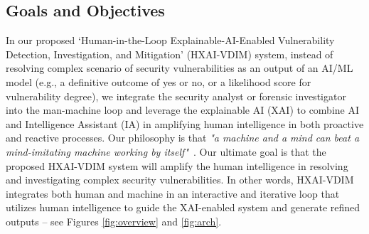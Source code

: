 \subsection{Goals and Objectives}

In our proposed `Human-in-the-Loop Explainable-AI-Enabled Vulnerability Detection, Investigation, and Mitigation' (HXAI-VDIM) system, instead of resolving complex scenario of security vulnerabilities as an output of an AI/ML model (e.g., a definitive outcome of yes or no, or a likelihood score for vulnerability degree), we integrate the security analyst or forensic investigator into the man-machine loop and leverage the explainable AI (XAI) to combine AI and Intelligence Assistant (IA) in amplifying human intelligence in both proactive and reactive processes. Our philosophy is that {\em "a machine and a mind can beat a mind-imitating machine working by itself"}~\cite{DBLP:conf/ifip/Brooks77}. Our ultimate goal is that the proposed HXAI-VDIM system will amplify the human intelligence in resolving and investigating complex security vulnerabilities. In other words, HXAI-VDIM integrates both human and machine in an interactive and iterative loop that utilizes human intelligence to guide the XAI-enabled system and generate refined outputs -- see Figures \ref{fig:overview} and \ref{fig:arch}.

